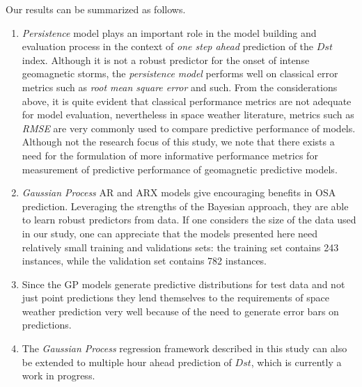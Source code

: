 Our results can be summarized as follows.
\begin{enumerate}
      \item \emph{Persistence} model plays an important role in the model building and evaluation process in the context of \emph{one step ahead} prediction of the $Dst$ index. Although it is not a robust predictor for the onset of intense geomagnetic storms, the \emph{persistence model} performs well on classical error metrics such as \emph{root mean square error} and such. From the considerations above, it is quite evident that classical performance metrics are not adequate for model evaluation, nevertheless in space weather literature, metrics such as \emph{RMSE} are very commonly used to compare predictive performance of models. Although not the research focus of this study, we note that there exists a need for the formulation of more informative performance metrics for measurement of predictive performance of geomagnetic predictive models.
      
      \item \emph{Gaussian Process} AR and ARX models give encouraging benefits in OSA prediction. Leveraging the strengths of the Bayesian approach, they are able to learn robust predictors from data. If one considers the size of the data used in our study, one can appreciate that the models presented here need relatively small training and validations sets: the training set contains 243 instances, while the validation set contains 782 instances.
      
      \item Since the GP models generate predictive distributions for test data and not just point predictions they lend themselves to the requirements of space weather prediction very well because of the need to generate error bars on predictions.
      
      \item The \emph{Gaussian Process} regression framework described in this study can also be extended to multiple hour ahead prediction of $Dst$, which is currently a work in progress.
\end{enumerate}





%
%
%
%
%

